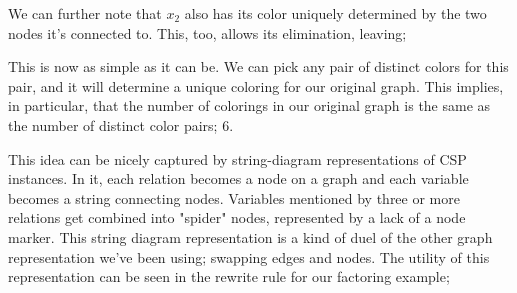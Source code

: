 We can further note that $x_2$ also has its color uniquely determined by the two nodes it's connected to. This, too, allows its elimination, leaving;

\begin{center}
\end{center}

This is now as simple as it can be. We can pick any pair of distinct colors for this pair, and it will determine a unique coloring for our original graph. This implies, in particular, that the number of colorings in our original graph is the same as the number of distinct color pairs; 6.

This idea can be nicely captured by string-diagram representations of CSP instances. In it, each relation becomes a node on a graph and each variable becomes a string connecting nodes. Variables mentioned by three or more relations get combined into "spider" nodes, represented by a lack of a node marker. This string diagram representation is a kind of duel of the other graph representation we've been using; swapping edges and nodes. The utility of this representation can be seen in the rewrite rule for our factoring example;

\begin{center}
\end{center}

